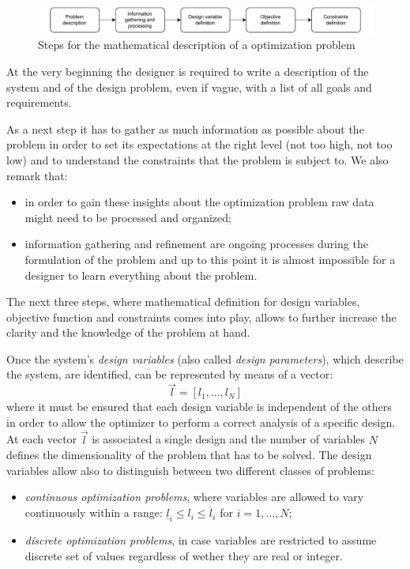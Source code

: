 \begin{figure}
	\centering
	\includegraphics[width=\textwidth]{img/opt_probl_math_formulation_steps.pdf}
	\caption{Steps for the mathematical description of a optimization problem} 
	\label{fig:opt_probl_math_formulation_steps}
\end{figure}

\smallskip
At the very beginning the designer is required to write a description of the system and of the design problem, even if vague, with a list of all goals and requirements.

As a next step it has to gather as much information as possible about the problem in order to set its expectations at the right level (not too high, not too low) and to understand the constraints that the problem is subject to.
We also remark that:
\begin{itemize}
	\item in order to gain these insights about the optimization problem raw data might need to be processed and organized;
	\item information gathering and refinement are ongoing processes during the formulation of the problem and up to this point it is almost impossible for a designer to learn everything about the problem.
\end{itemize}
The next three steps, where mathematical definition for design variables, objective function and constraints comes into play, allows to further increase the clarity and the knowledge of the problem at hand.

\smallskip
Once the system's \emph{design variables} (also called \emph{design parameters}), which describe the system, are identified, can be represented by means of a vector:
\begin{equation}
	\vec{l} = [l_1, \dots, l_N]
\end{equation}
where it must be ensured that each design variable is independent of the others in order to allow the optimizer to perform a correct analysis of a specific design.
At each vector $\vec{l}$ is associated a single design and the number of variables $N$ defines the dimensionality of the problem that has to be solved. The design variables allow also to distinguish between two different classes of problems:
\begin{itemize}
	\item \emph{continuous optimization problems}, where variables are allowed to vary continuously within a range: $\underline{l}_i \le l_i \le \overline{l}_i$ for $i = 1, \dots, N$;
	\item \emph{discrete optimization problems}, in case variables are restricted to assume discrete set of values regardless of wether they are real or integer.
\end{itemize}

